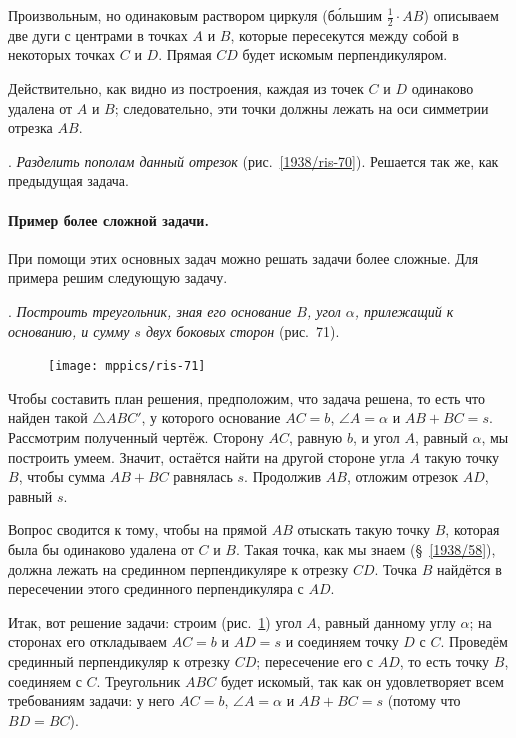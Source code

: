 \documentclass[oneside]{book}
\begin{document}
Произвольным, но одинаковым раствором циркуля (б\'{о}льшим $\tfrac12\cdot AB$) описываем две дуги с центрами в точках $A$ и $B$, которые пересекутся между собой в некоторых точках $C$ и $D$.
Прямая $CD$ будет искомым перпендикуляром.

Действительно, как видно из построения, каждая из точек $C$ и $D$ одинаково удалена от $A$ и $B$;
следовательно, эти точки должны лежать на оси симметрии отрезка $AB$.

\smallskip
{}.
\emph{Разделить пополам данный отрезок} (рис.~\ref{1938/ris-70}).
Решается так же, как предыдущая задача.

\paragraph{Пример более сложной задачи.}\label{1938/68}
При помощи этих основных задач можно решать задачи более сложные.
Для примера решим следующую задачу.

\smallskip
{}.
\emph{Построить треугольник, зная его основание $B$, угол $\alpha$, прилежащий к основанию, и сумму $s$ двух боковых сторон} (рис.~71).

\begin{figure}[h!]
\centering
\texttt{[image: mppics/ris-71]}
\caption{}\label{1938/ris-71}
\end{figure}

Чтобы составить план решения, предположим, что задача решена, то есть что найден такой $\triangle ABC'$, у которого основание $AC = b$, $\angle A=\alpha$ и $AB+BC=s$.
Рассмотрим полученный чертёж.
Сторону $AC$, равную $b$, и угол $A$, равный $\alpha$, мы построить умеем.
Значит, остаётся найти на другой стороне угла $A$ такую точку $B$, чтобы сумма $AB+BC$ равнялась $s$.
Продолжив $AB$, отложим отрезок $AD$, равный $s$.

Вопрос сводится к тому, чтобы на прямой $AB$ отыскать такую точку $B$, которая была бы одинаково удалена от $C$ и $B$.
Такая точка, как мы знаем (§~\ref{1938/58}), должна лежать на срединном перпендикуляре к отрезку $CD$. 
Точка $B$ найдётся в пересечении этого срединного перпендикуляра с $AD$. 

Итак, вот решение задачи:
строим (рис.~\ref{1938/ris-71}) угол $A$, равный данному углу $\alpha$;
на сторонах его откладываем $AC=b$ и $AD=s$ и соединяем точку $D$ с $C$.
Проведём срединный перпендикуляр к отрезку $CD$;
пересечение его с $AD$, то есть точку $B$, соединяем с $C$.
Треугольник $ABC$ будет  искомый, так как он удовлетворяет всем требованиям задачи:
у него $AC=b$, $\angle A = \alpha$ и $AB+BC=s$ (потому что $BD=BC$).
\end{document}
